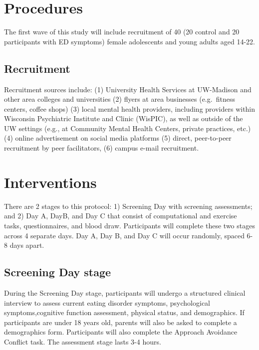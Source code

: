 \documentclass[
]{book}
\begin{document}
\hypertarget{procedures}{%
\chapter{Procedures}\label{procedures}}

The first wave of this study will include recruitment of 40 (20 control and 20 participants with ED symptoms) female adolescents and young adults aged 14-22.

\hypertarget{recruitment}{%
\section{Recruitment}\label{recruitment}}

Recruitment sources include: (1) University Health Services at UW-Madison and other area colleges and universities (2) flyers at area businesses (e.g.~fitness centers, coffee shops) (3) local mental health providers, including providers within Wisconsin Psychiatric Institute and Clinic (WisPIC), as well as outside of the UW settings (e.g., at Community Mental Health Centers, private practices, etc.) (4) online advertisement on social media platforms (5) direct, peer-to-peer recruitment by peer facilitators, (6) campus e-mail recruitment.

\hypertarget{interventions}{%
\chapter{Interventions}\label{interventions}}

There are 2 stages to this protocol: 1) Screening Day with screening assessments; and 2) Day A, DayB, and Day C that consist of computational and exercise tasks, questionnaires, and blood draw. Participants will complete these two stages across 4 separate days. Day A, Day B, and Day C will occur randomly, spaced 6-8 days apart.

\hypertarget{screening-day-stage}{%
\section{Screening Day stage}\label{screening-day-stage}}

During the Screening Day stage, participants will undergo a structured clinical interview to assess current eating disorder symptoms, psychological symptoms,cognitive function assessment, physical status, and demographics. If participants are under 18 years old, parents will also be asked to complete a demographics form. Participants will also complete the Approach Avoidance Conflict task. The assessment stage lasts 3-4 hours.
\end{document}
